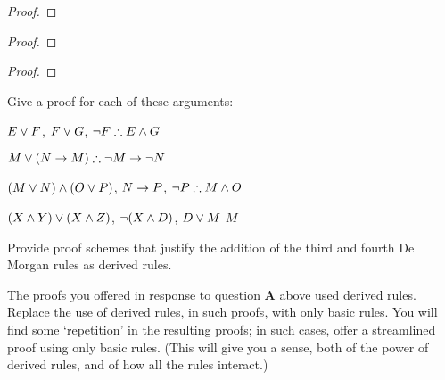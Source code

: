 \begin{minipage}{0.35\textwidth}
\begin{proof}
 {}
 {}
\end{proof}
\end{minipage}\qquad\begin{minipage}{0.35\textwidth}
\begin{proof}
\open
\close
{}
\end{proof}\end{minipage}

\begin{proof}
\open
	 {}
		\open
	\close
\close
{}
\end{proof}


\problempart 
Give a proof for each of these arguments:
\begin{earg}
\item $E\vee F$, $F\vee G$, $\neg F \mathrel{\therefore} E \wedge G$
\item $M\vee(N\rightarrow M) \mathrel{\therefore} \neg M \rightarrow \neg N$
\item $(M \vee N) \wedge (O \vee P)$, $N \rightarrow P$, $\neg P \mathrel{\therefore} M\wedge O$
\item $(X\wedge Y)\vee(X\wedge Z)$, $\neg(X\wedge D)$, $D\vee M$ \ttherefore $M$
\end{earg}


\problempart
Provide proof schemes that justify the addition of the third and fourth De Morgan rules as derived rules. 



\problempart
The proofs you offered in response to question \textbf{A} above used derived rules. Replace the use of derived rules, in such proofs, with only basic rules. You will find some `repetition' in the resulting proofs; in such cases, offer a streamlined proof using only basic rules.  (This will give you a sense, both of the power of derived rules, and of how all the rules interact.)

